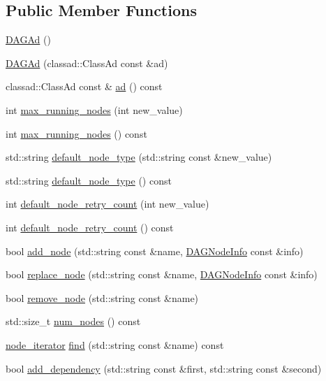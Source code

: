 \subsection*{Public Member Functions}
\begin{CompactItemize}
\item 
\hyperlink{classglite_1_1wms_1_1jdl_1_1DAGAd_a0}{DAGAd} ()
\item 
\hyperlink{classglite_1_1wms_1_1jdl_1_1DAGAd_a1}{DAGAd} (classad::Class\-Ad const \&ad)
\item 
classad::Class\-Ad const \& \hyperlink{classglite_1_1wms_1_1jdl_1_1DAGAd_a2}{ad} () const 
\item 
int \hyperlink{classglite_1_1wms_1_1jdl_1_1DAGAd_a3}{max\_\-running\_\-nodes} (int new\_\-value)
\item 
int \hyperlink{classglite_1_1wms_1_1jdl_1_1DAGAd_a4}{max\_\-running\_\-nodes} () const 
\item 
std::string \hyperlink{classglite_1_1wms_1_1jdl_1_1DAGAd_a5}{default\_\-node\_\-type} (std::string const \&new\_\-value)
\item 
std::string \hyperlink{classglite_1_1wms_1_1jdl_1_1DAGAd_a6}{default\_\-node\_\-type} () const 
\item 
int \hyperlink{classglite_1_1wms_1_1jdl_1_1DAGAd_a7}{default\_\-node\_\-retry\_\-count} (int new\_\-value)
\item 
int \hyperlink{classglite_1_1wms_1_1jdl_1_1DAGAd_a8}{default\_\-node\_\-retry\_\-count} () const 
\item 
bool \hyperlink{classglite_1_1wms_1_1jdl_1_1DAGAd_a9}{add\_\-node} (std::string const \&name, \hyperlink{classglite_1_1wms_1_1jdl_1_1DAGNodeInfo}{DAGNode\-Info} const \&info)
\item 
bool \hyperlink{classglite_1_1wms_1_1jdl_1_1DAGAd_a10}{replace\_\-node} (std::string const \&name, \hyperlink{classglite_1_1wms_1_1jdl_1_1DAGNodeInfo}{DAGNode\-Info} const \&info)
\item 
bool \hyperlink{classglite_1_1wms_1_1jdl_1_1DAGAd_a11}{remove\_\-node} (std::string const \&name)
\item 
std::size\_\-t \hyperlink{classglite_1_1wms_1_1jdl_1_1DAGAd_a12}{num\_\-nodes} () const 
\item 
\hyperlink{classglite_1_1wms_1_1jdl_1_1DAGAdNodeIterator}{node\_\-iterator} \hyperlink{classglite_1_1wms_1_1jdl_1_1DAGAd_a13}{find} (std::string const \&name) const 
\item 
bool \hyperlink{classglite_1_1wms_1_1jdl_1_1DAGAd_a14}{add\_\-dependency} (std::string const \&first, std::string const \&second)

\end{CompactItemize}
